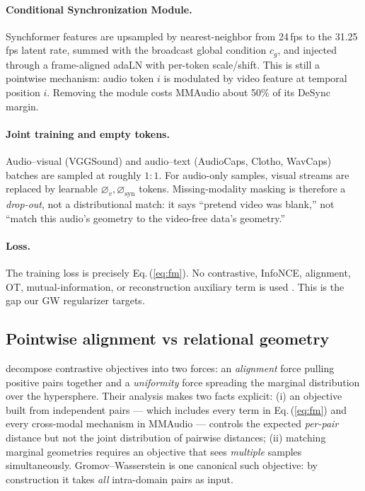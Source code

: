 \paragraph{Conditional Synchronization Module.}
Synchformer features are upsampled by nearest-neighbor from
24\,fps to the 31.25\,fps latent rate, summed with the broadcast
global condition $c_g$, and injected through a frame-aligned
adaLN with per-token scale/shift. This is still a pointwise
mechanism: audio token $i$ is modulated by video feature at
temporal position $i$. Removing the module costs MMAudio about
50\% of its DeSync margin.

\paragraph{Joint training and empty tokens.}
Audio--visual (VGGSound) and audio--text (AudioCaps, Clotho,
WavCaps) batches are sampled at roughly $1{:}1$. For audio-only
samples, visual streams are replaced by learnable
$\varnothing_v, \varnothing_{\mathrm{syn}}$ tokens. Missing-modality
masking is therefore a \emph{drop-out}, not a distributional
match: it says ``pretend video was blank,'' not ``match this
audio's geometry to the video-free data's geometry.''

\paragraph{Loss.} The training loss is precisely
Eq.\,(\ref{eq:fm}). No contrastive, InfoNCE, alignment, OT,
mutual-information, or reconstruction auxiliary term is used
\citep{cheng2024mmaudio}. This is the gap our GW regularizer
targets.

\subsection{Pointwise alignment vs relational geometry}
\label{sec:background:pointwise-vs-relational}
\citet{wang2020understanding} decompose contrastive objectives
into two forces: an \emph{alignment} force pulling positive
pairs together and a \emph{uniformity} force spreading the
marginal distribution over the hypersphere. Their analysis
makes two facts explicit: (i) an objective built from
independent pairs --- which includes every term in
Eq.\,(\ref{eq:fm}) and every cross-modal mechanism in
MMAudio --- controls the expected
\emph{per-pair} distance but not the joint distribution of
pairwise distances; (ii) matching marginal geometries requires an
objective that sees \emph{multiple} samples simultaneously.
Gromov--Wasserstein is one canonical such objective: by
construction it takes \emph{all} intra-domain pairs as input.

